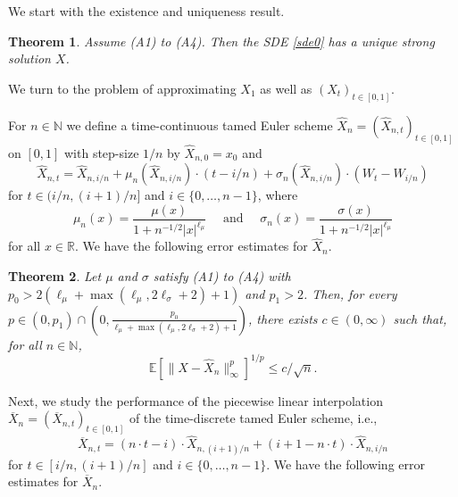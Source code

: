 \documentclass[11pt]{amsart}
\newcommand{\R}{{\mathbb R}}
\newcommand{\N}{{\mathbb N}}
\newcommand{\EE}{{\mathbb E}}
\newcommand{\eul}{{\widehat X}}
\theoremstyle{plain}
\newtheorem{theorem}{Theorem}
\theoremstyle{definition}
\begin{document}
We start with the existence and uniqueness result.

\begin{theorem}\label{Thm0}
Assume (A1) to (A4). Then the SDE \eqref{sde0} has a unique strong solution $X$.
\end{theorem}

We turn to the problem of approximating $X_1$ as well as $(X_t)_{t\in[0,1]}$.

For $n\in\N$ we define a  time-continuous tamed Euler scheme $\eul_{n}=(\eul_{n,t})_{t\in[0,1]}$   on $[0,1]$ with step-size $1/n$ %
by
$\eul_{n,0}=x_0$ and
\begin{equation}\label{te}
\eul_{n,t}=\eul_{n,i/n}+\mu_n(\eul_{n,i/n}) \cdot (t-i/n)+\sigma_n(\eul_{n,i/n})\cdot (W_t-W_{i/n})
\end{equation}
for $t\in (i/n,(i+1)/n]$
and $i\in\{0,\ldots,n-1\}$,
where
\begin{equation}\label{tamedcoeff}
\mu_n(x) = \frac{\mu(x)}{1+n^{-1/2}|x|^{\ell_\mu}} \quad \mbox{ and }\quad  \sigma_n(x) = \frac{\sigma(x)}{1+n^{-1/2}|x|^{\ell_\mu}}
\end{equation}
for all $x\in\R$. We have the following error estimates for $\eul_{n}$.

\begin{theorem}\label{Thm1}\mbox{}
			 Let $\mu$ and $\sigma$ satisfy (A1) to (A4) with $p_0 > 2(\ell_\mu +  \max(\ell_\mu, 2\ell_\sigma +2)+ 1)$ and $p_1>2$.
		Then, for every $p\in (0,p_1)\cap (0,\frac{p_0}{\ell_\mu +  \max(\ell_\mu, 2\ell_\sigma +2)+ 1})$,
		there exists $c\in (0,\infty)$ such that, for all $n\in\N$,
		\begin{equation}\label{result4a}
			\EE[ \|X-\eul_{n}    \|_\infty^p]^{1/p}	\le  c/\sqrt{n}.	
		\end{equation}
		


\end{theorem}



Next, we study the performance of the piecewise linear interpolation
$\overline{X}_n = (\overline X_{n,t})_{t\in [0,1]}$
of the time-discrete tamed Euler scheme, i.e.,
\[
\overline X_{n,t} = (n\cdot t-i)\cdot\widehat X_{n,(i+1)/n} + (i+1-n\cdot t)\cdot \widehat X_{n,i/n}
\]
for $t\in [i/n,(i+1)/n]$
 and $i\in\{0,\ldots,n-1\}$. We have the following error estimates for $\overline X_n$.
\end{document}
